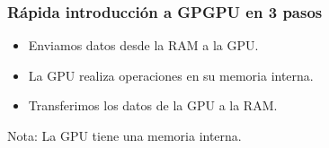 \documentclass{beamer}
\begin{document}
\begin{frame}
\frametitle{Rápida introducción a GPGPU en 3 pasos}

\begin{itemize}
\item Enviamos datos desde la RAM a la GPU.
\item La GPU realiza operaciones en su memoria interna.
\item Transferimos los datos de la GPU a la RAM.
\end{itemize}

Nota: La GPU tiene una memoria interna.

\end{frame}
%
%
%
%
%
%	
%
%
%
%
%
%
%
%
%
%
%
%
%
%
%
\end{document}
